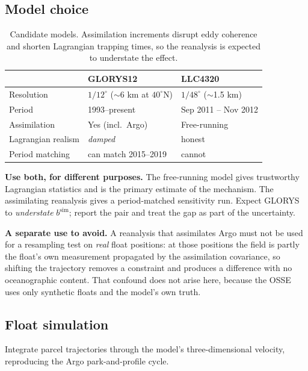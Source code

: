 \documentclass[11pt]{article}
\begin{document}
\subsection{Model choice}
\label{sec:modelchoice}

\begin{table}[h]
\centering
\begin{tabular}{lll}
\toprule
 & GLORYS12 & LLC4320 \\
\midrule
Resolution & $1/12^\circ$ ($\sim$6 km at $40^\circ$N) & $1/48^\circ$ ($\sim$1.5 km) \\
Period & 1993--present & Sep 2011 -- Nov 2012 \\
Assimilation & Yes (incl.\ Argo) & Free-running \\
Lagrangian realism & \emph{damped} & honest \\
Period matching & can match 2015--2019 & cannot \\
\bottomrule
\end{tabular}
\caption{Candidate models. Assimilation increments disrupt eddy coherence and shorten
Lagrangian trapping times, so the reanalysis is expected to understate the effect.}
\end{table}

\textbf{Use both, for different purposes.} The free-running model gives trustworthy Lagrangian
statistics and is the primary estimate of the mechanism. The assimilating reanalysis gives a
period-matched sensitivity run. Expect GLORYS to \emph{understate} $b^{\text{sim}}$; report the
pair and treat the gap as part of the uncertainty.

\textbf{A separate use to avoid.} A reanalysis that assimilates Argo must not be used for a
resampling test on \emph{real} float positions: at those positions the field is partly the
float's own measurement propagated by the assimilation covariance, so shifting the trajectory
removes a constraint and produces a difference with no oceanographic content. That confound
does not arise here, because the OSSE uses only synthetic floats and the model's own truth.

\subsection{Float simulation}
\label{sec:simulation}

Integrate parcel trajectories through the model's three-dimensional velocity, reproducing the
Argo park-and-profile cycle.
\end{document}
